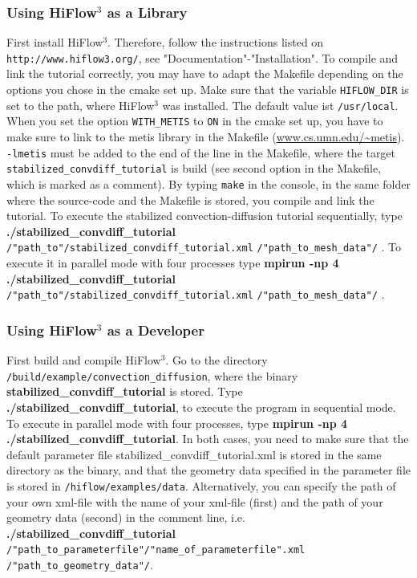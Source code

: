 \documentclass[a4paper, 11pt, twoside]{article}
\begin{document}
\subsubsection{Using HiFlow$^3$ as a Library}\label{sectionlibrary}
First install HiFlow$^3$. Therefore, follow the instructions listed on \verb'http://www.hiflow3.org/', see "Documentation"-"Installation".
To compile and link the tutorial correctly, you may have to adapt the Makefile depending on the options you chose in the cmake set up. Make sure that the variable \verb'HIFLOW_DIR' is set to the path, where HiFlow$^3$ was installed. The default value ist \verb'/usr/local'. When you set the option \verb'WITH_METIS' to \verb'ON' in the cmake set up, you have to make sure to link to the metis library in the Makefile (\url{www.cs.umn.edu/~metis}). \texttt{-lmetis} must be added to the end of the line in the Makefile, where the target 
\texttt{stabilized\_convdiff\_tutorial} is build (see second option in the Makefile, which is marked as a comment). By typing \verb'make' in the console, in the same folder where the source-code and the Makefile is stored, you compile and link the tutorial. 
To execute the stabilized convection-diffusion tutorial sequentially, type \textbf{./stabilized\_convdiff\_tutorial} \verb'/"path_to"/stabilized_convdiff_tutorial.xml' \verb'/"path_to_mesh_data"/' . To execute it in parallel mode  with four processes type \newline \textbf{mpirun -np 4 ./stabilized\_convdiff\_tutorial} \verb'/"path_to"/stabilized_convdiff_tutorial.xml' \verb'/"path_to_mesh_data"/' .

\subsubsection{Using HiFlow$^3$ as a Developer}\label{sectiondeveloper}
First build and compile HiFlow$^3$. Go to the directory \verb'/build/example/convection_diffusion', where the binary \textbf{stabilized\_convdiff\_tutorial} is stored. Type \textbf{./stabilized\_convdiff\_tutorial}, to execute the program in sequential mode. To execute in parallel mode  with four processes, type \textbf{mpirun -np 4 ./stabilized\_convdiff\_tutorial}. In both cases, you need to make sure that the default parameter file stabilized\_convdiff\_tutorial.xml is stored in the same directory as the binary, and that the geometry data specified in the parameter file is stored in \verb'/hiflow/examples/data'. Alternatively, you can specify the path of your own xml-file with the name of your xml-file (first) and the path of your geometry data (second) in the comment line, i.e. \textbf{./stabilized\_convdiff\_tutorial} \verb'/"path_to_parameterfile"/"name_of_parameterfile".xml' \verb'/"path_to_geometry_data"/'.
\end{document}

